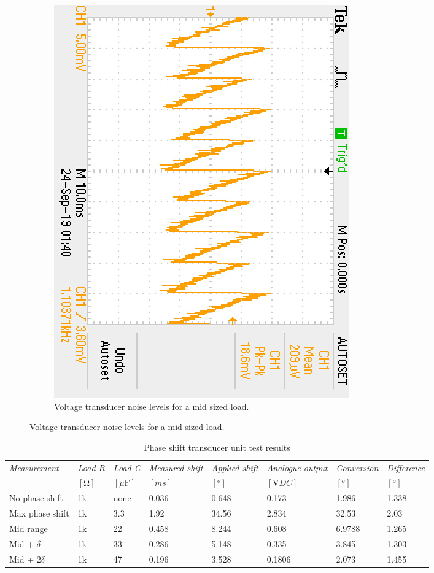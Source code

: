 \begin{figure}
\begin{subfigure}[]{0.45\textwidth}
  		\includegraphics[height=1\linewidth,angle=90]{./Figures/phase_noise_measure}
		    \caption{Voltage transducer noise levels for a mid sized load.} \label{subfig:phase_noise}
     \end{subfigure}
 \end{figure}

\begin{table}[h]
        \centering
        \footnotesize
        \caption{Phase shift transducer unit test results}
         \begin{tabular}{p{1.8cm}p{1.3cm}p{1.3cm}p{1.5cm}p{1.5cm}p{1.8cm}p{1.8cm}p{1.8cm}}
          \toprule
             \textit{\footnotesize Measurement} & \textit{\footnotesize Load R} & \textit{\footnotesize Load C} & \textit{{\footnotesize Measured shift}} & \textit{{\footnotesize Applied shift}} & \textit{{\footnotesize Analogue output}} & \textit{\footnotesize Conversion} & \textit{\footnotesize Difference}\\
             & $[\si{\ohm}]$ & $[\si{\mu\farad}]$ & $[ms]$ & $[^o]$ & $[\si{\volt}DC]$ & $[^o]$ & $[^o]$ \\
          \midrule
          No phase shift & 1k & none & 0.036 & 0.648 & 0.173 & 1.986 & 1.338 \\
          Max phase shift & 1k & 3.3 & 1.92 & 34.56 & 2.834 & 32.53 & 2.03 \\
          Mid range & 1k & 22 & 0.458 & 8.244 & 0.608 & 6.9788 & 1.265 \\
          Mid + $\delta$ & 1k & 33 & 0.286 & 5.148 & 0.335 & 3.845 & 1.303 \\
          Mid + $2\delta$ & 1k & 47 & 0.196 & 3.528 & 0.1806 & 2.073 & 1.455 \\
          \bottomrule
        \end{tabular}
     \label{tab:phase_integrated_test}
\end{table}







